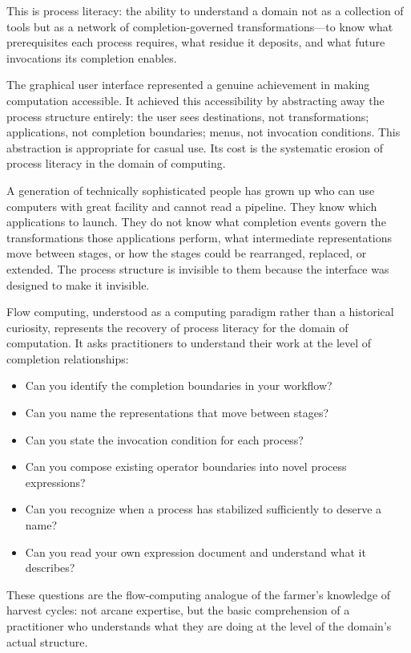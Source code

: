\documentclass[12pt, a4paper]{article}
\begin{document}
This is process literacy: the ability to understand a domain not
as a collection of tools but as a network of completion-governed
transformations---to know what prerequisites each process requires,
what residue it deposits, and what future invocations its completion
enables.

The graphical user interface represented a genuine achievement in
making computation accessible. It achieved this accessibility by
abstracting away the process structure entirely: the user sees
destinations, not transformations; applications, not completion
boundaries; menus, not invocation conditions. This abstraction is
appropriate for casual use. Its cost is the systematic erosion of
process literacy in the domain of computing.

A generation of technically sophisticated people has grown up
who can use computers with great facility and cannot read a
pipeline. They know which applications to launch. They do not
know what completion events govern the transformations those
applications perform, what intermediate representations move
between stages, or how the stages could be rearranged, replaced,
or extended. The process structure is invisible to them because
the interface was designed to make it invisible.

Flow computing, understood as a computing paradigm rather than a
historical curiosity, represents the recovery of process literacy
for the domain of computation. It asks practitioners to understand
their work at the level of completion relationships:

\begin{itemize}
\item Can you identify the completion boundaries in your workflow?
\item Can you name the representations that move between stages?
\item Can you state the invocation condition for each process?
\item Can you compose existing operator boundaries into novel
  process expressions?
\item Can you recognize when a process has stabilized sufficiently
  to deserve a name?
\item Can you read your own expression document and understand
  what it describes?
\end{itemize}

These questions are the flow-computing analogue of the farmer's
knowledge of harvest cycles: not arcane expertise, but the basic
comprehension of a practitioner who understands what they are
doing at the level of the domain's actual structure.
\end{document}
